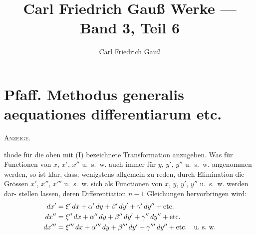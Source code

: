 \documentclass[12pt,a4paper]{article}
\title{Carl Friedrich Gauß Werke --- Band 3, Teil 6}
\author{Carl Friedrich Gauß}
\date{}
\begin{document}
\maketitle
\thispagestyle{empty}
\tableofcontents
\newpage


\section*{Pfaff. Methodus generalis aequationes differentiarum etc.}

\noindent\textsc{Anzeige.}

\smallskip
\noindent
thode für die oben mit (I) bezeichnete Transformation anzugeben. Was für
Functionen von $x$, $x'$, $x''$ u.~s.~w. auch immer für $y$, $y'$, $y''$ u.~s.~w. angenommen
werden, so ist klar, dass, wenigstens allgemein zu reden, durch Elimination die
Grössen $x'$, $x''$, $x'''$ u.~s.~w. sich als Functionen von $x$, $y$, $y'$, $y''$ u.~s.~w. werden dar-
stellen lassen, deren Differentiation $n-1$ Gleichungen hervorbringen wird:
\begin{align*}
dx' &= \xi'\,dx + \alpha'\,dy + \beta'\,dy' + \gamma'\,dy'' + \text{etc.}\\
dx'' &= \xi''\,dx + \alpha''\,dy + \beta''\,dy' + \gamma''\,dy'' + \text{etc.}\\
dx'''&= \xi'''\,dx + \alpha'''\,dy + \beta'''\,dy' + \gamma'''\,dy'' + \text{etc.\quad u.~s.~w.}
\end{align*}
\end{document}
